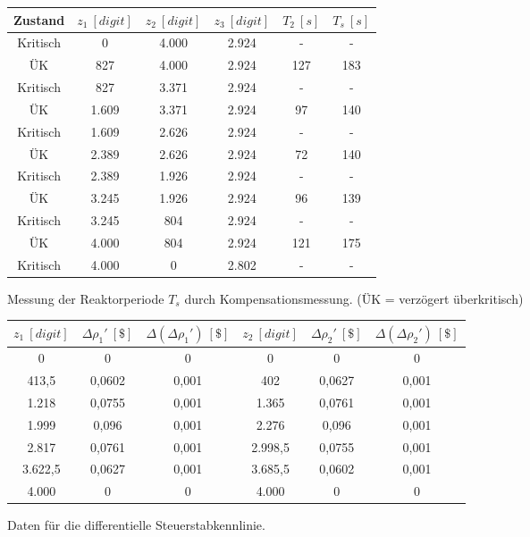     \begin{center}
   
    	\begin{tabular}{c|c|c|c|c|c}
    	Zustand	&	$z_1\ [\unit{digit}]$	&	$z_2\ [\unit{digit}]$	&	$z_3\ [\unit{digit}]$	&	$T_2\ [\unit{s}]$	&	$T_s\ [\unit{s}]$\\
    	\hline
    	Kritisch	&	0		&	4.000	&	2.924	&	-	&	-	\\
    	ÜK			&	827		&	4.000	&	2.924	&	127	&	183\\
    	Kritisch	&	827		&	3.371	&	2.924	&	-	&	-\\
    	ÜK			&	1.609	&	3.371	&	2.924	&	97	&	140\\
    	Kritisch	&	1.609	&	2.626	&	2.924	&	-	&	-\\
    	ÜK			&	2.389	&	2.626	&	2.924	&	72	&	140\\
    	Kritisch	&	2.389	&	1.926	&	2.924	&	-	&	-\\
    	ÜK			&	3.245	&	1.926	&	2.924	&	96	&	139\\
    	Kritisch	&	3.245	&	804		&	2.924	&	-	&	-\\
    	ÜK			&	4.000	&	804		&	2.924	&	121	&	175\\
    	Kritisch	&	4.000	&	0		&	2.802	&	-	&	-	
    	\end{tabular} \caption{Messung der Reaktorperiode $T_s$ durch Kompensationsmessung. (ÜK = verzögert überkritisch)}
    	\hspace{3mm}
    	
    	\begin{tabular}{c|c|c|c|c|c} \label{exp:dataDiffSSKL}
    	$z_1\ [\unit{digit}]$	&	$\Delta\rho_1\prime\ [\unit{\$}]$	&	$\Delta(\Delta\rho_1\prime)\ [\unit{\$}]$	&	$z_2\ [\unit{digit}]$	&	$\Delta\rho_2\prime\ [\unit{\$}]$	&	$\Delta(\Delta\rho_2\prime)\ [\unit{\$}]$\\
    	\hline		
    	0		&	0		&		0	&	0		&	0		&	0\\
    	413,5	&	0,0602	&	0,001	&	402		&	0,0627	&	0,001\\
    	1.218	&	0,0755	&	0,001	&	1.365	&	0,0761	&	0,001\\
    	1.999	&	0,096	&	0,001	&	2.276	&	0,096	&	0,001\\
    	2.817	&	0,0761	&	0,001	&	2.998,5	&	0,0755	&	0,001\\
    	3.622,5	&	0,0627	&	0,001	&	3.685,5	&	0,0602	&	0,001\\
    	4.000	&	0		&	0		&	4.000	&	0		&	0    	
    	\end{tabular}\caption{Daten für die differentielle Steuerstabkennlinie.}	
    \end{center}
   
